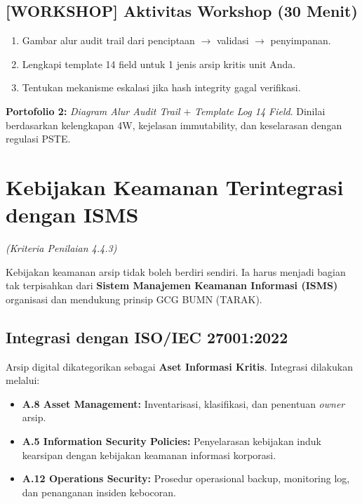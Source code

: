 \documentclass[12pt,a4paper]{report}
\begin{document}
\section*{[WORKSHOP] Aktivitas Workshop (30 Menit)}
\begin{enumerate}[leftmargin=*]
    \item Gambar alur audit trail dari penciptaan $\rightarrow$ validasi $\rightarrow$ penyimpanan.
    \item Lengkapi template 14 field untuk 1 jenis arsip kritis unit Anda.
    \item Tentukan mekanisme eskalasi jika hash integrity gagal verifikasi.
\end{enumerate}

\begin{outputbox}
[DONE] \textbf{Portofolio 2:} \textit{Diagram Alur Audit Trail} + \textit{Template Log 14 Field}. Dinilai berdasarkan kelengkapan 4W, kejelasan immutability, dan keselarasan dengan regulasi PSTE.
\end{outputbox}

\newpage
\chapter{Kebijakan Keamanan Terintegrasi dengan ISMS}
\textit{(Kriteria Penilaian 4.4.3)}

Kebijakan keamanan arsip tidak boleh berdiri sendiri. Ia harus menjadi bagian tak terpisahkan dari \textbf{Sistem Manajemen Keamanan Informasi (ISMS)} organisasi dan mendukung prinsip GCG BUMN (TARAK).

\section{Integrasi dengan ISO/IEC 27001:2022}
Arsip digital dikategorikan sebagai \textbf{Aset Informasi Kritis}. Integrasi dilakukan melalui:
\begin{itemize}[leftmargin=*]
    \item \textbf{A.8 Asset Management:} Inventarisasi, klasifikasi, dan penentuan \textit{owner} arsip.
    \item \textbf{A.5 Information Security Policies:} Penyelarasan kebijakan induk kearsipan dengan kebijakan keamanan informasi korporasi.
    \item \textbf{A.12 Operations Security:} Prosedur operasional backup, monitoring log, dan penanganan insiden kebocoran.
\end{itemize}
\end{document}

